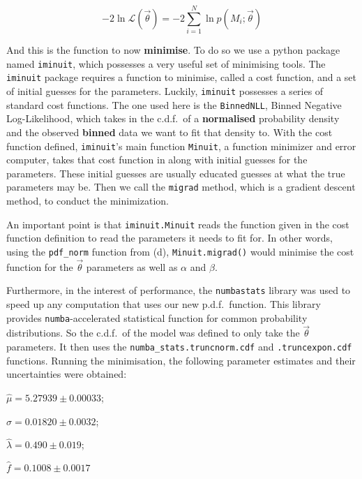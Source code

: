 \documentclass[12pt]{report} %
\begin{document}
\begin{equation}
    -2\ln{\mathcal{L}(\vec{\theta})} = -2\displaystyle \sum_{i=1}^{N} \ln{p(M_{i};\vec{\theta})}
\end{equation}

And this is the function to now \textbf{minimise}. To do so we use a python package named \texttt{iminuit}, which possesses a very useful set of minimising tools. The \texttt{iminuit} package requires a function to minimise, called a cost function, and a set of initial guesses for the parameters. Luckily, \texttt{iminuit} possesses a series of standard cost functions. The one used here is the \texttt{BinnedNLL}, Binned Negative Log-Likelihood, which takes in the c.d.f.\ of a \textbf{normalised} probability density and the observed \textbf{binned} data we want to fit that density to. With the cost function defined, \texttt{iminuit}'s main function \texttt{Minuit}, a function minimizer and error computer, takes that cost function in along with initial guesses for the parameters. These initial guesses are usually educated guesses at what the true parameters may be. Then we call the \texttt{migrad} method, which is a gradient descent method, to conduct the minimization.

An important point is that \texttt{iminuit.Minuit} reads the function given in the cost function definition to read the parameters it needs to fit for. In other words, using the \texttt{pdf\_norm} function from (d), \texttt{Minuit.migrad()} would minimise the cost function for the $\vec{\theta}$ parameters as well as $\alpha$ and $\beta$.

Furthermore, in the interest of performance, the \texttt{numba\-stats} library was used to speed up any computation that uses our new p.d.f.\ function. This library provides \texttt{numba}-accelerated statistical function for common probability distributions. So the c.d.f.\ of the model was defined to only take the $\vec{\theta}$ parameters. It then uses the \texttt{numba\_stats.truncnorm.cdf} and \texttt{.truncexpon.cdf} functions. Running the minimisation, the following parameter estimates and their uncertainties were obtained:  

\begin{center}
    $\hat{\mu} = 5.27939 \pm 0.00033$;  

    $\hat{\sigma} = 0.01820 \pm 0.0032$;  
    
    $\hat{\lambda} = 0.490 \pm 0.019$;  

    $\hat{f} = 0.1008 \pm 0.0017$
\end{center}
\end{document}
